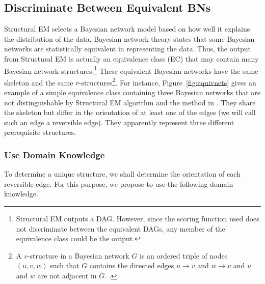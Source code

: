 \documentclass{edm_template}
\begin{document}


\subsection{Discriminate Between Equivalent BNs}
\label{sec:discriminatebns}
Structural EM selects a Bayesian network model based on how well it explains the distribution of the data. 
Bayesian network theory states that some Bayesian networks are statistically equivalent in representing the data.
Thus, the output from Structural EM is actually an equivalence class (EC) that may contain many Bayesian network structures.\footnote{Structural EM outputs a DAG. However, since the scoring function used does not discriminate between the equivalent DAGs, any member of the equivalence class could be the output.}
These equivalent Bayesian networks have the same skeleton and the same $v$-structures\footnote{
A $v$-structure in a Bayesian network $G$ is an ordered triple of nodes $(u,v,w)$ such that $G$ contains the directed edges $u\rightarrow v$ and $w\rightarrow v$ and $u$ and $w$ are not adjacent in $G$. \cite{verma1990equivalence}.}. 
For instance, Figure~\ref{fig:equivnets} gives an example of a simple equivalence class containing three Bayesian networks 
that are not distinguishable by Structural EM algorithm and the method in \cite{scheines2014discovering}.
They share the skeleton but differ in the orientation of at least one of the edges (we will call such an edge a reversible edge). 
They apparently represent three different prerequisite structures.

\subsubsection{Use Domain Knowledge}
\label{sec:usedomain}
To determine a unique structure, we shall determine the orientation of each reversible edge.
For this purpose, we propose to use the following domain knowledge.
\end{document}
